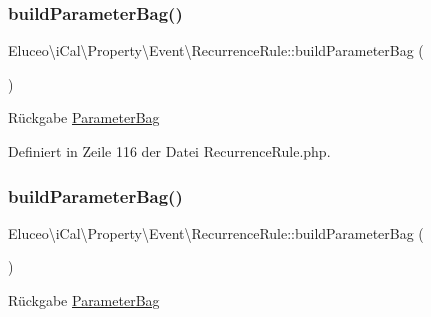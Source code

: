 \subsubsection{\texorpdfstring{build\+Parameter\+Bag()}{buildParameterBag()}\hspace{0.1cm}{\footnotesize\ttfamily [1/3]}}
{\footnotesize\ttfamily Eluceo\textbackslash{}i\+Cal\textbackslash{}\+Property\textbackslash{}\+Event\textbackslash{}\+Recurrence\+Rule\+::build\+Parameter\+Bag (\begin{DoxyParamCaption}{ }\end{DoxyParamCaption})\hspace{0.3cm}{\ttfamily [protected]}}

\begin{DoxyReturn}{Rückgabe}
\mbox{\hyperlink{class_eluceo_1_1i_cal_1_1_parameter_bag}{Parameter\+Bag}} 
\end{DoxyReturn}


Definiert in Zeile 116 der Datei Recurrence\+Rule.\+php.

\mbox{\label{class_eluceo_1_1i_cal_1_1_property_1_1_event_1_1_recurrence_rule_ad1be91dbdcb26d1f931a17758780b2a5}} 
\subsubsection{\texorpdfstring{build\+Parameter\+Bag()}{buildParameterBag()}\hspace{0.1cm}{\footnotesize\ttfamily [2/3]}}
{\footnotesize\ttfamily Eluceo\textbackslash{}i\+Cal\textbackslash{}\+Property\textbackslash{}\+Event\textbackslash{}\+Recurrence\+Rule\+::build\+Parameter\+Bag (\begin{DoxyParamCaption}{ }\end{DoxyParamCaption})\hspace{0.3cm}{\ttfamily [protected]}}

\begin{DoxyReturn}{Rückgabe}
\mbox{\hyperlink{class_eluceo_1_1i_cal_1_1_parameter_bag}{Parameter\+Bag}} 
\end{DoxyReturn}



